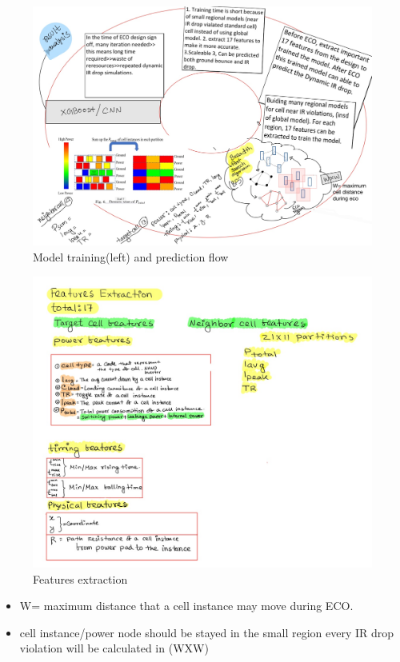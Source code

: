 \documentclass[a4paper]{article}
\begin{document}
\begin{figure}[htbp]
\centering
\includegraphics[width=.9\linewidth]{./img/p4.JPG}
\caption{\label{fig:org91e31c4}Model training(left) and prediction flow}
\end{figure}


\begin{figure}[htbp]
\centering
\includegraphics[width=.9\linewidth]{./img/p3.JPG}
\caption{\label{fig:orgf94de3a}Features extraction}
\end{figure}



\begin{itemize}
\item W= maximum distance that a cell instance may move during ECO.
\item cell instance/power node should be stayed in the small region
every IR drop violation will be calculated in (WXW)
\end{itemize}
\end{document}

